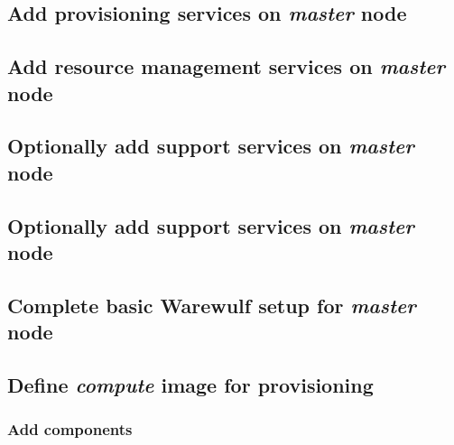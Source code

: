 \documentclass[letterpaper]{article}
\begin{document}
\subsection{Add provisioning services on {\em master} node} \label{sec:add_provisioning}




\subsection{Add resource management services on {\em master} node} \label{sec:add_rm}


\subsection{Optionally add \InfiniBand{} support services on {\em master} node} \label{sec:add_ofed}


\subsection{Optionally add \OmniPath{} support services on {\em master} node} \label{sec:add_opa}


\vspace*{-0.15cm}
\subsection{Complete basic Warewulf setup for {\em master} node} \label{sec:setup_ww}



\subsection{Define {\em compute} image for provisioning}


\subsubsection{Add \OHPC{} components} \label{sec:add_components}

\end{document}

